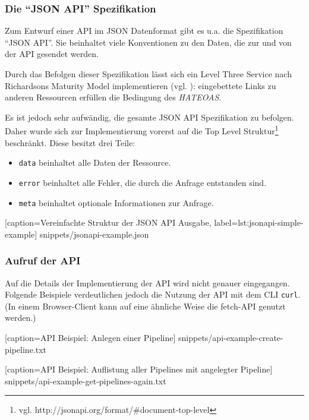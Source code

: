 \subsubsection{Die ``JSON API'' Spezifikation}
\label{subsec:jsonapi}

Zum Entwurf einer API im JSON Datenformat gibt es u.a. die Spezifikation ``JSON API''. Sie beinhaltet viele Konventionen zu den Daten, die zur und von der API gesendet werden.

Durch das Befolgen dieser Spezifikation lässt sich ein Level Three Service nach Richardsons Maturity Model implementieren (vgl. \citep[20]{Webber2010}): eingebettete Links zu anderen Ressourcen erfüllen die Bedingung des \emph{\ac{HATEOAS}}.

Es ist jedoch sehr aufwändig, die gesamte JSON API Spezifikation zu befolgen. Daher wurde sich zur Implementierung vorerst auf die Top Level Struktur\footnote{vgl. http://jsonapi.org/format/\#document-top-level} beschränkt. Diese besitzt drei Teile:

\begin{itemize}
  \item \texttt{data} beinhaltet alle Daten der Ressource.
  \item \texttt{error} beinhaltet alle Fehler, die durch die Anfrage entstanden sind.
  \item \texttt{meta} beinhaltet optionale Informationen zur Anfrage.
\end{itemize}


  [caption={Vereinfachte Struktur der JSON API Ausgabe},
  label={lst:jsonapi-simple-example}]
  {snippets/jsonapi-example.json}

\subsubsection{Aufruf der API}
\label{subsec:api-usage}

Auf die Details der Implementierung der API wird nicht genauer eingegangen. Folgende Beispiele verdeutlichen jedoch die Nutzung der API mit dem \ac{CLI} \texttt{curl}. (In einem Browser-Client kann auf eine ähnliche Weise die fetch-API genutzt werden.)


  [caption={API Beispiel: Anlegen einer Pipeline}]
  {snippets/api-example-create-pipeline.txt}


  [caption={API Beispiel: Auflistung aller Pipelines mit angelegter Pipeline}]
  {snippets/api-example-get-pipelines-again.txt}

